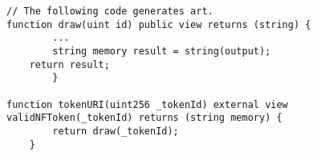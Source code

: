 \begin{lstlisting}[language=Solidity, basicstyle=\scriptsize]
// The following code generates art.
function draw(uint id) public view returns (string) {
		...
		string memory result = string(output);
    return result;
		}

function tokenURI(uint256 _tokenId) external view validNFToken(_tokenId) returns (string memory) {
        return draw(_tokenId);
    }
 
 \end{lstlisting}